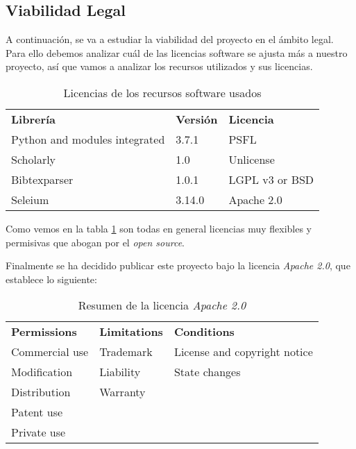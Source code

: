 \newpage

\subsection{Viabilidad Legal}
A continuación, se va a estudiar la viabilidad del proyecto en el ámbito legal. Para ello debemos analizar cuál de las licencias software se ajusta más a nuestro proyecto, así que vamos a analizar los recursos utilizados y sus licencias.
\begin{table}[htb]
	\begin{center}
		\begin{tabular}{p{4cm} p{1.5cm} p{3.5cm}}
			\toprule
			\textbf{Librería} & \textbf{Versión} & \textbf{Licencia} \\
			\otoprule
			Python and modules integrated & 3.7.1 & PSFL\cite{psfl} \\
			Scholarly & 1.0 & Unlicense\cite{unlicense} \\
			Bibtexparser & 1.0.1 & LGPL v3\cite{lgplv3} or BSD\cite{bsd} \\
			Seleium &  	3.14.0 & Apache 2.0\cite{apache}\\
			\bottomrule
		\end{tabular}
		\caption{Licencias de los recursos software usados}
		\label{licenses}
	\end{center}
\end{table}

Como vemos en la tabla \ref{licenses} son todas en general licencias muy flexibles y permisivas que abogan por el \emph{open source}.

Finalmente se ha decidido publicar este proyecto bajo la licencia \emph{Apache 2.0}, que establece lo siguiente: 

\begin{table}[htb]
	\begin{center}
		\begin{tabular}{p{4cm} p{3cm} p{5cm}}
			\toprule
			\textbf{Permissions} & \textbf{Limitations} & \textbf{Conditions} \\
			\otoprule
			Commercial use  &  Trademark  &  License and copyright notice  \\
			Modification &  Liability  &  State changes  \\
			Distribution &  Warranty  &  \\
			Patent use &   &  \\
			Private  use &   &  \\
			\bottomrule
		\end{tabular}
		\caption{Resumen de la licencia \emph{Apache 2.0}}
	\end{center}
\end{table}
